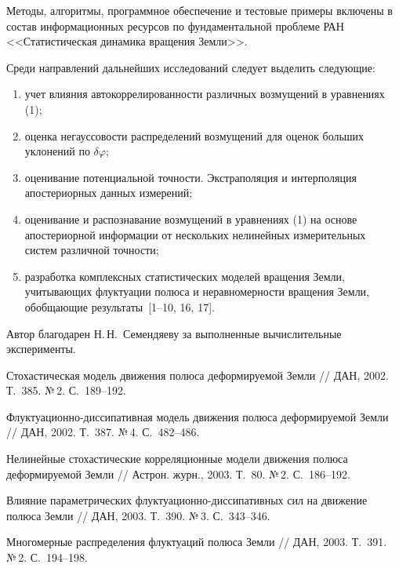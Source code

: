 \begin{multicols}{2}
Методы, алгоритмы, программное обеспечение и тестовые примеры
включены в состав информационных ресурсов по фундаментальной
проблеме РАН <<Статистическая динамика вращения Земли>>.

Среди направлений дальнейших исследований следует выделить
следующие:
\begin{enumerate}[(1)]
\item  учет влияния автокоррелированности различных возмущений в
уравнениях (1);
\item %
оценка негауссовости распределений возмущений для оценок больших
уклонений по $\delta \varphi$;
\item %
оценивание потенциальной точности. Экстраполяция и интерполяция
апостериорных данных измерений;
\item %
оценивание и распознавание возмущений в уравнениях (1) на основе
апостериорной информации от нескольких нелинейных измерительных
систем различной точности;
\item %
разработка комплексных статистических моделей вращения Земли,
учитывающих флуктуации полюса и неравномерности вращения Земли,
обобщающие результаты~[1--10, 16, 17].
\end{enumerate}

\bigskip
Автор благодарен Н.\,Н.~Семендяеву за выполненные вычислительные
эксперименты.

{\small\frenchspacing
{%
\begin{thebibliography}{99}

Стохастическая модель движения полюса деформируемой Земли //
ДАН, 2002. Т.~385. №\,2. С.~189--192.

Флуктуационно-дис\-си\-па\-тивная модель движения полюса деформируемой Земли //
ДАН, 2002. Т.~387. №\,4. С.~482--486.

Нелинейные стохастические корреляционные модели движения полюса деформируемой
Земли // Астрон. журн., 2003. Т.~80. №\,2. С.~186--192.

Влияние параметрических флуктуационно-диссипативных сил на движение
полюса Земли // ДАН, 2003. Т.~390. №\,3. С.~343--346.

Многомерные распределения флуктуаций полюса Земли //
ДАН, 2003. Т.~391. №\,2. С.~194--198.


\end{thebibliography}}}
\end{multicols}
